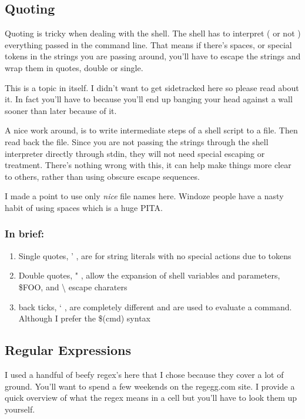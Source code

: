 \documentclass{article}
\begin{document}
\subsection{Quoting}\label{quoting}

Quoting is tricky when dealing with the shell. The shell has to
interpret ( or not ) everything passed in the command line. That means
if there's spaces, or special tokens in the strings you are passing
around, you'll have to escape the strings and wrap them in quotes,
double or single.

This is a topic in itself. I didn't want to get sidetracked here so
please read about it. In fact you'll have to because you'll end up
banging your head against a wall sooner than later because of it.

A nice work around, is to write intermediate steps of a shell script to
a file. Then read back the file. Since you are not passing the strings
through the shell interpreter directly through stdin, they will not need
special escaping or treatment. There's nothing wrong with this, it can
help make things more clear to others, rather than using obscure escape
sequences.

I made a point to use only \emph{nice} file names here. Windoze people
have a nasty habit of using spaces which is a huge PITA.

\subsubsection{In brief:}\label{in-brief}

\begin{enumerate}
\def\labelenumi{\arabic{enumi}.}
\itemsep1pt\parskip0pt
\item
  Single quotes, ' , are for string literals with no special actions due
  to tokens
\item
  Double quotes, " , allow the expansion of shell variables and
  parameters, \$FOO, and \textbackslash{} escape charaters
\item
  back ticks, ` , are completely different and are used to evaluate a
  command. Although I prefer the \$(cmd) syntax
\end{enumerate}

\subsection{Regular Expressions}\label{regular-expressions}

I used a handful of beefy regex's here that I chose because they cover a
lot of ground. You'll want to spend a few weekends on the regegg.com
site. I provide a quick overview of what the regex means in a cell but
you'll have to look them up yourself.
\end{document}
